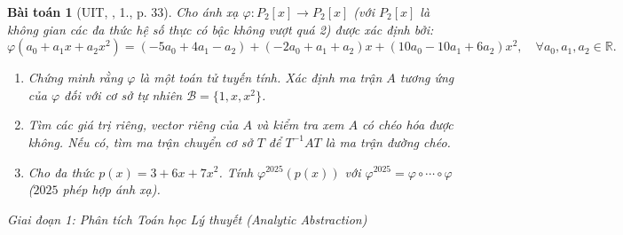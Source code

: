 \documentclass{article}
\newtheorem{baitoan}{Bài toán}
\begin{document}
\begin{baitoan}[UIT, \cite{VMS_VMC2025}, 1., p. 33]
Cho ánh xạ $\varphi: P_2[x] \to P_2[x]$ (với $P_2[x]$ là không gian các đa thức hệ số thực có bậc không vượt quá 2) được xác định bởi:
\begin{equation}
    \varphi(a_0 + a_1x + a_2x^2) = (-5a_0 + 4a_1 - a_2) + (-2a_0 + a_1 + a_2)x + (10a_0 - 10a_1 + 6a_2)x^2, \quad \forall a_0, a_1, a_2 \in \mathbb{R}.
\end{equation}
\begin{enumerate}
    \item[(a)] Chứng minh rằng $\varphi$ là một toán tử tuyến tính. Xác định ma trận $A$ tương ứng của $\varphi$ đối với cơ sở tự nhiên $\mathcal{B} = \{1, x, x^2\}$.
    \item[(b)] Tìm các giá trị riêng, vector riêng của $A$ và kiểm tra xem $A$ có chéo hóa được không. Nếu có, tìm ma trận chuyển cơ sở $T$ để $T^{-1}AT$ là ma trận đường chéo.
    \item[(c)] Cho đa thức $p(x) = 3 + 6x + 7x^2$. Tính $\varphi^{2025}(p(x))$ với $\varphi^{2025} = \varphi \circ \cdots \circ \varphi$ ($2025$ phép hợp ánh xạ).
\end{enumerate}
\end{baitoan}

\vspace{0.5em}\noindent\emph{Giai đoạn 1: Phân tích Toán học Lý thuyết (Analytic Abstraction)}
\end{document}

